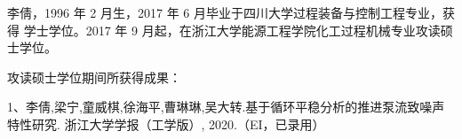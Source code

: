 \cleardoublepage
{}

李倩，1996 年 2 月生，2017 年 6 月毕业于四川大学过程装备与控制工程专业，获得
学士学位。2017 年 9 月起，在浙江大学能源工程学院化工过程机械专业攻读硕士学位。 

\quad

攻读硕士学位期间所获得成果：

1、李倩,梁宁,童威棋,徐海平,曹琳琳,吴大转.基于循环平稳分析的推进泵流致噪声特性研究.
浙江大学学报（工学版）, 2020.（EI，已录用） 
